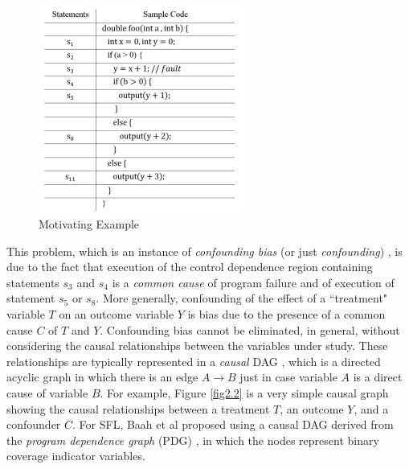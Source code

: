 \begin{figure}[htb!]
\vspace{0em}
\begin{center}
\includegraphics[width=0.6\textwidth]{chapter2_fig1.pdf}
\vspace {0em}\caption{Motivating Example} \label{fig2.1}
\end{center}
\vspace {0em}
\end{figure}
 
This problem, which is an instance of {\it confounding bias} (or just {\it confounding}) \cite{pearl2000models}, is due to the fact that execution of the control dependence region \cite{ball1993s} containing statements $s_3$ and $s_4$ is a {\it common cause} of program failure and of execution of statement $s_5$ or $s_8$.  More generally, confounding of the effect of a ``treatment" variable $T$ on an outcome variable $Y$ is bias due to the presence of a common cause $C$ of $T$ and $Y$.  Confounding bias cannot be eliminated, in general, without considering the causal relationships between the variables under study.  These relationships are typically represented in a {\it causal} DAG \cite{pearl2000models}, which is a directed acyclic graph in which there is an edge $A \rightarrow B$ just in case variable $A$ is a direct cause of variable $B$.  For example, Figure \ref{fig2.2} is a very simple causal graph showing the causal relationships between a treatment $T$, an outcome $Y$, and a confounder $C$.  For SFL, Baah et al \cite{baah2010causal,baah2011mitigating} proposed using a causal DAG derived from the {\it program dependence graph} (PDG) \cite{ferrante1987program}, in which the nodes represent binary coverage indicator variables.

